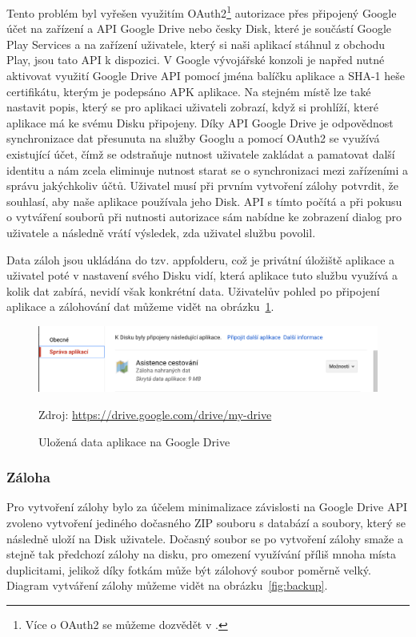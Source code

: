 \documentclass[czech,master,public,dept460,male,java,cpdeclaration]{diploma}
\begin{document}
Tento problém byl vyřešen využitím OAuth2\footnote{Více o OAuth2 se můžeme dozvědět v \cite{oauth2}.}
autorizace přes připojený Google účet na zařízení a API Google Drive nebo česky Disk,
 které je součástí Google Play Services a na zařízení uživatele, který si naši aplikací stáhnul z obchodu Play,
 jsou tato API k dispozici.
V Google vývojářské konzoli je napřed nutné aktivovat využití Google Drive API pomocí jména balíčku aplikace a SHA-1 heše
certifikátu, kterým je podepsáno APK aplikace. Na stejném místě lze také nastavit popis, který se pro aplikaci
uživateli zobrazí, když si prohlíží, které aplikace má ke svému Disku připojeny.
Díky API Google Drive je odpovědnost synchronizace dat přesunuta na služby Googlu a pomocí
OAuth2 se využívá existující účet, čímž se odstraňuje nutnost uživatele zakládat a pamatovat
 další identitu a nám zcela eliminuje nutnost starat se o synchronizaci mezi zařízeními a správu jakýchkoliv účtů.
 Uživatel musí při prvním vytvoření zálohy potvrdit, že souhlasí, aby naše aplikace používala jeho Disk.
 API s tímto počítá a při pokusu o vytváření souborů při nutnosti autorizace sám nabídne ke zobrazení
 dialog pro uživatele a následně vrátí výsledek, zda uživatel službu povolil.

 Data záloh jsou ukládána do tzv. appfolderu\cite{driveappfolder}, což je privátní úložiště aplikace
 a uživatel poté v nastavení svého Disku vidí,
  která aplikace tuto službu využívá a kolik dat zabírá, nevidí však konkrétní data.
  Uživatelův pohled po připojení aplikace a zálohování dat můžeme vidět na obrázku~\ref{fig:connecteddrive}.

\begin{figure}[H]
        \centering
                \includegraphics[scale=0.3]{img/connectedDrive.png}
        \caption{Uložená data aplikace na Google Drive}
        \label{fig:connecteddrive}
        \centering Zdroj: \url{https://drive.google.com/drive/my-drive}
\end{figure}

\subsubsection{Záloha}
Pro vytvoření zálohy bylo za účelem minimalizace závislosti na Google Drive API zvoleno vytvoření jediného
dočasného ZIP souboru s databází a soubory, který se následně uloží na Disk uživatele. Dočasný soubor se po
vytvoření zálohy smaže a stejně tak předchozí zálohy na disku, pro omezení využívání příliš mnoha místa duplicitami,
jelikož díky fotkám může být zálohový soubor poměrně velký. Diagram vytváření zálohy můžeme vidět na obrázku~\ref{fig:backup}.
\end{document}
